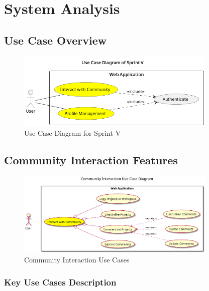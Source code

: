 \section{System Analysis}

\subsection{Use Case Overview}

\begin{figure}[H]
\centering
\includegraphics[width=0.85\textwidth]{conception/SprintV/use_case_diagrams/use_case_diagram_of_SprintV.png}
\caption{Use Case Diagram for Sprint V}
\label{fig:use_case_sprint_v}
\end{figure}

\subsection{Community Interaction Features}

\begin{figure}[H]
\centering
\includegraphics[width=0.85\textwidth]{conception/SprintV/use_case_diagrams/refined_use_case_feature_community_interaction.png}
\caption{Community Interaction Use Cases}
\label{fig:community_interaction_use_case}
\end{figure}

\subsubsection{Key Use Cases Description}


